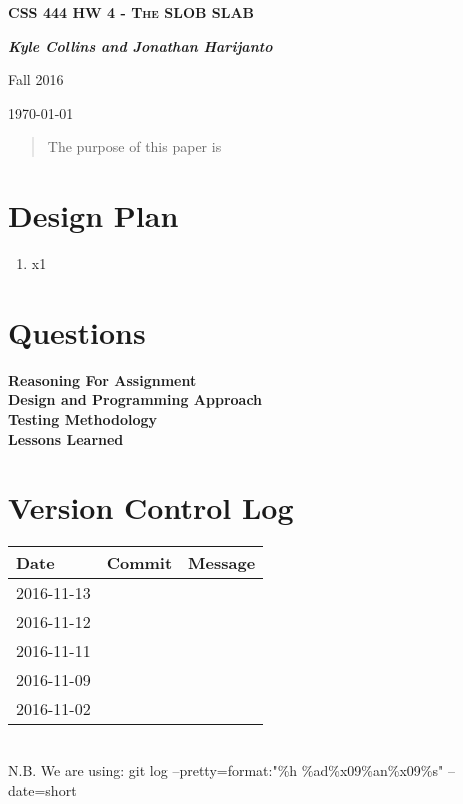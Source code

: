 \documentclass[letterpaper,10pt,draftclsnofoot,titlepage,onecolumn]{IEEEtran}
\begin{document}
	
	\begin{titlepage}
		\centering
		{\scshape\LARGE \textbf{CSS 444 HW 4 - The SLOB SLAB}\par}
		{\LARGE\itshape \textbf{Kyle Collins and Jonathan Harijanto}\par}
		{\LARGE Fall 2016\par}
		{\LARGE \today\par}
		
	\vfill		
		
\begin{abstract}
The purpose of this paper is 
\end{abstract}
		
\end{titlepage}
	
\clearpage
\tableofcontents
	
\clearpage
\section{Design Plan}
 	 
\begin{enumerate}
\item x1
\end{enumerate}
 
\clearpage
	\section{Questions}
	
	\textbf{Reasoning For Assignment}\\

		
	\textbf{Design and Programming Approach}\\


	\textbf{Testing Methodology}\\


	\textbf{Lessons Learned}\\

	\clearpage

	\section{Version Control Log}
	
\begin{center}

\begin{tabular}{| m{2cm} | m{8cm} | m{4cm} | } 
\hline
 Date & Commit & Message \\ [0.5ex] 
 \hline\hline
2016-11-13 &  &  \\
 \hline 
  2016-11-12 &  & \\
 \hline
  2016-11-11 &  &  \\
 \hline
  2016-11-09 &  &  \\
 \hline
   2016-11-02 &  &  \\
 \hline
 
\end{tabular}

\end{center}
\hfill\\
N.B. We are using: git log --pretty=format:"\%h \%ad\%x09\%an\%x09\%s" --date=short
	
\end{document}
